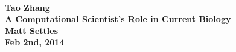 \documentclass[12pt]{article}
\begin{document}
\paragraph{Tao Zhang\\A Computational Scientist's Role in Current Biology\\Matt Settles\\Feb 2nd, 2014}
\paragraph{}
\end{document}
